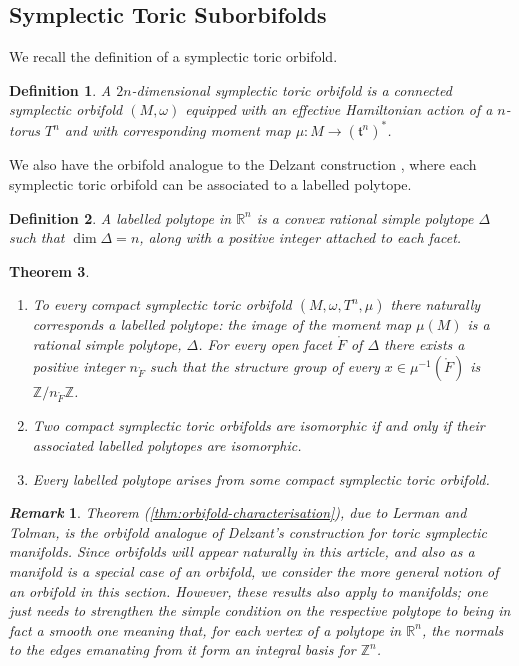 \documentclass{amsart}
\newtheorem{theorem}{Theorem}[section]
\newtheorem{defn}[theorem]{Definition\rm}
\newtheorem{remark}{\it Remark\/}
\newcommand{\ra}{\rightarrow}
\newcommand{\w}{\omega}
\newcommand{\RR}{\mathbb{R}}
\newcommand{\ZZ}{\mathbb{Z}}
\newcommand{\mft}{\mathfrak{t}}
\newcommand{\open}[1]{\mathring{#1}}
\begin{document}
	\subsection{Symplectic Toric Suborbifolds}
	
	We recall the definition of a symplectic toric orbifold.
	
	\begin{defn}{\cite{Aud04,Lerman1997}}
		A $2n$-dimensional \emph{symplectic toric orbifold} is a connected symplectic orbifold $(M, \w)$ equipped with an effective Hamiltonian action of a $n$-torus $T^{n}$ and with corresponding moment map $\mu : M \ra (\mft^{n})^{\ast}$.
	\end{defn}

	We also have the orbifold analogue to the Delzant construction \cite{Del88}, where each symplectic toric orbifold can be associated to a labelled polytope.
	
	\begin{defn}{\cite{Lerman1997}}
		A \emph{labelled polytope} in $\RR^{n}$ is a convex rational simple polytope $\Delta$ such that $\dim\Delta = n$, along with a positive integer attached to each facet.
	\end{defn}

	\begin{theorem}{\cite{Lerman1997}}
		\begin{enumerate}\label{thm:orbifold-characterisation}
			\item To every compact symplectic toric orbifold $(M, \w, T^{n}, \mu)$ there naturally corresponds a labelled polytope: the image of the moment map $\mu(M)$ is a rational simple polytope, $\Delta$. For every open facet $\open{F}$ of $\Delta$ there exists a positive integer $n_{\open{F}}$ such that the structure group of every $x \in \mu^{-1}(\open{F})$ is $\ZZ/n_{\open{F}}\ZZ$.
			\item Two compact symplectic toric orbifolds are isomorphic if and only if their associated labelled polytopes are isomorphic.
			\item Every labelled polytope arises from some compact symplectic toric orbifold.
		\end{enumerate}
	\end{theorem}

	\begin{remark}
		Theorem (\ref{thm:orbifold-characterisation}), due to Lerman and Tolman, is the orbifold analogue of Delzant's construction for toric symplectic manifolds. Since orbifolds will appear naturally in this article, and also as a manifold is a special case of an orbifold, we consider the more general notion of an orbifold in this section. However, these results also apply to manifolds; one just needs to strengthen the simple condition on the respective polytope to being in fact a \emph{smooth} one meaning that, for each vertex of a polytope in $\RR^{n}$, the normals to the edges emanating from it form an integral basis for $\ZZ^{n}$.
	\end{remark}
	
\end{document}
